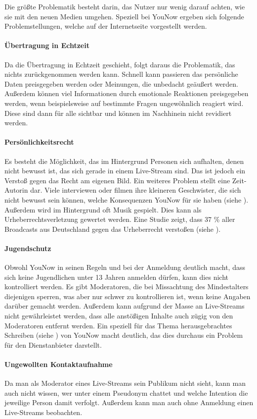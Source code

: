 Die größte Problematik besteht darin, das Nutzer nur wenig darauf achten, wie sie mit den neuen Medien umgehen. Speziell bei YouNow ergeben sich folgende Problemstellungen, welche auf der Internetseite \cite{KS15} vorgestellt werden.

\paragraph{Übertragung in Echtzeit}
Da die Übertragung in Echtzeit geschieht, folgt daraus die Problematik, das nichts zurückgenommen werden kann. Schnell kann passieren das persönliche Daten preisgegeben werden oder Meinungen, die unbedacht geäußert werden. Außerdem können viel Informationen durch emotionale Reaktionen preisgegeben werden, wenn beispielsweise auf bestimmte Fragen ungewöhnlich reagiert wird. Diese sind dann für alle sichtbar und können im Nachhinein nicht revidiert werden.

\paragraph{Persönlichkeitsrecht}
Es besteht die Möglichkeit, das im Hintergrund Personen sich aufhalten, denen nicht bewusst ist, das sich gerade in einem Live-Stream sind. Das ist jedoch ein Verstoß gegen das Recht am eigenen Bild. Ein weiteres Problem stellt eine Zeit-Autorin dar. Viele interviewen oder filmen ihre kleineren Geschwister, die sich nicht bewusst sein können, welche Konsequenzen YouNow für sie haben (siehe \cite{ZEIT15}).
Außerdem wird im Hintergrund oft Musik gespielt. Dies kann als Urheberrechtsverletzung gewertet werden. Eine Studie zeigt, dass 37 \% aller Broadcasts aus Deutschland gegen das Urheberrecht verstoßen (siehe \cite{HFMNF15}).

\paragraph{Jugendschutz}
Obwohl YouNow in seinen Regeln und bei der Anmeldung deutlich macht, dass sich keine Jugendlichen unter 13 Jahren anmelden dürfen, kann dies nicht kontrolliert werden. Es gibt Moderatoren, die bei Missachtung des Mindestalters diejenigen sperren, was aber nur schwer zu kontrollieren ist, wenn keine Angaben darüber gemacht werden. Außerdem kann aufgrund der Masse an Live-Streams nicht gewährleistet werden, dass alle anstößigen Inhalte auch zügig von den Moderatoren entfernt werden. Ein speziell für das Thema herausgebrachtes Schreiben (siehe \cite{YTD15}) von YouNow macht deutlich, das dies durchaus ein Problem für den Dienstanbieter darstellt. 

\paragraph{Ungewollten Kontaktaufnahme}
Da man als Moderator eines Live-Streams sein Publikum nicht sieht, kann man auch nicht wissen, wer unter einem Pseudonym chattet und welche Intention die jeweilige Person damit verfolgt. Außerdem kann man auch ohne Anmeldung einen Live-Streams beobachten.


